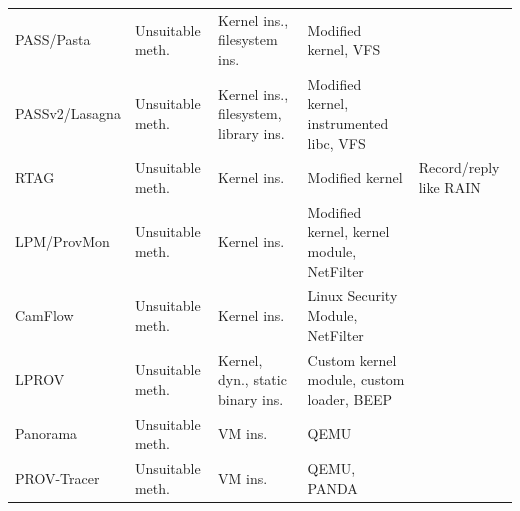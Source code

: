 \begin{table}
{\begin{tabular}{p{}p{}p{}p{}p{}}
PASS/Pasta \cite{muniswamy-reddy_provenance-aware_2006} & Unsuitable meth. & Kernel ins., filesystem ins.            & Modified kernel, VFS                          &                                                               \\
PASSv2/Lasagna \cite{muniswamy-reddy_layering_2009}     & Unsuitable meth. & Kernel ins., filesystem, library ins.   & Modified kernel, instrumented libc, VFS       &                                                               \\
RTAG \cite{ji_enabling_2018}                            & Unsuitable meth. & Kernel ins.                             & Modified kernel                               & Record/reply like RAIN                                        \\
LPM/ProvMon \cite{bates_trustworthy_2015}               & Unsuitable meth. & Kernel ins.                             & Modified kernel, kernel module, NetFilter     &                                                               \\
CamFlow \cite{pasquier_practical_2017}                  & Unsuitable meth. & Kernel ins.                             & Linux Security Module, NetFilter              &                                                               \\
LPROV \cite{wang_lprov_2018}                            & Unsuitable meth. & Kernel, dyn., static binary ins.        & Custom kernel module, custom loader, BEEP     &                                                               \\
Panorama \cite{yin_panorama_2007}                       & Unsuitable meth. & VM ins.                                 & QEMU                                          &                                                               \\
PROV-Tracer \cite{stamatogiannakis_decoupling_2015}     & Unsuitable meth. & VM ins.                                 & QEMU, PANDA                                   &                                                               \\
\end{tabular}
}

\end{table}

